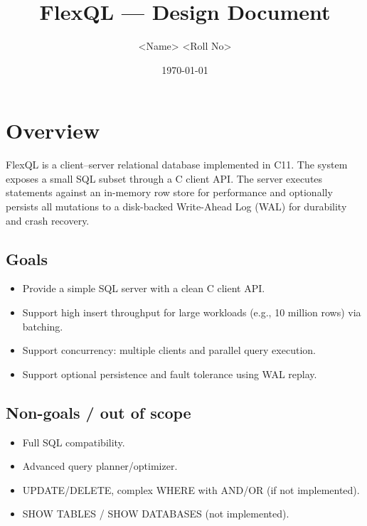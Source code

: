\documentclass[11pt,a4paper]{article}
\title{FlexQL --- Design Document}
\author{<Name> \; <Roll No>}
\date{\today}
\begin{document}
\maketitle
\tableofcontents
\newpage

\section{Overview}
FlexQL is a client--server relational database implemented in C11. The system exposes a small SQL subset through a C client API. The server executes statements against an in-memory row store for performance and optionally persists all mutations to a disk-backed Write-Ahead Log (WAL) for durability and crash recovery.

\subsection{Goals}
\begin{itemize}
  \item Provide a simple SQL server with a clean C client API.
  \item Support high insert throughput for large workloads (e.g., 10 million rows) via batching.
  \item Support concurrency: multiple clients and parallel query execution.
  \item Support optional persistence and fault tolerance using WAL replay.
\end{itemize}

\subsection{Non-goals / out of scope}
\begin{itemize}
  \item Full SQL compatibility.
  \item Advanced query planner/optimizer.
  \item UPDATE/DELETE, complex WHERE with AND/OR (if not implemented).
  \item SHOW TABLES / SHOW DATABASES (not implemented).
\end{itemize}
\end{document}
